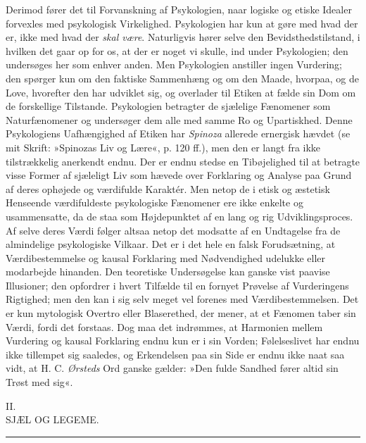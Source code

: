 \documentclass[12pt,a4paper,openany]{book}
\newcommand{\opage}[1]{\marginnote{\footnotesize\textit{[#1]}}}
\begin{document}
Derimod fører det til Forvanskning af Psykologien, naar logiske og
etiske Idealer forvexles med psykologisk Virkelighed. Psykologien har
kun at gøre med hvad der er, ikke med hvad der \emph{skal være}.
Naturligvis hører selve den Bevidsthedstilstand, i hvilken det gaar op
for os, at der er noget vi skulle, ind under Psykologien; den undersøges
her som enhver anden. Men Psykologien anstiller ingen Vurdering; den
spørger kun om den faktiske Sammenhæng og om den Maade, hvorpaa, og de
Love, hvorefter den har udviklet sig, og overlader til Etiken at fælde
sin Dom om de forskellige Tilstande. Psykologien betragter de sjælelige
Fænomener som Naturfænomener og undersøger dem alle med samme Ro og
Upartiskhed. Denne Psykologiens Uafhængighed af Etiken har
\emph{Spinoza} allerede ernergisk hævdet (se mit Skrift: »Spinozas Liv
og Lære«, p. 120 ff.), men den er langt fra ikke tilstrækkelig anerkendt
endnu. Der er endnu stedse en Tibøjelighed til at betragte visse Former
af sjæleligt Liv som hævede over Forklaring og Analyse paa Grund af
deres ophøjede og værdifulde Karaktér. Men netop de i etisk og æstetisk
Henseende værdifuldeste psykologiske Fænomener ere ikke enkelte og
usammensatte, da de staa som Højdepunktet af en lang og rig
Udviklingsproces. Af selve deres Værdi følger altsaa netop det modsatte
af en Undtagelse fra de almindelige psykologiske Vilkaar. Det er i det
hele en falsk Forudsætning, at Værdibestemmelse og kausal Forklaring med
Nødvendighed udelukke eller modarbejde hinanden. Den teoretiske
Undersøgelse kan ganske
\opage{35}vist paavise Illusioner; den opfordrer i hvert Tilfælde til en
fornyet Prøvelse af Vurderingens Rigtighed; men den kan i sig selv meget
vel forenes med Værdibestemmelsen. Det er kun mytologisk Overtro eller
Blaserethed, der mener, at et Fænomen taber sin Værdi, fordi det
forstaas. Dog maa det indrømmes, at Harmonien mellem Vurdering og kausal
Forklaring endnu kun er i sin Vorden; Følelseslivet har endnu ikke
tillempet sig saaledes, og Erkendelsen paa sin Side er endnu ikke naat
saa vidt, at H. C. \emph{Ørsteds} Ord ganske gælder: »Den fulde Sandhed
fører altid sin Trøst med sig«.

\clearpage
\opage{36}\begin{center}II.\\[4pt] SJÆL OG LEGEME.\\[2pt]\rule{1.5cm}{0.4pt}\end{center}
\end{document}
